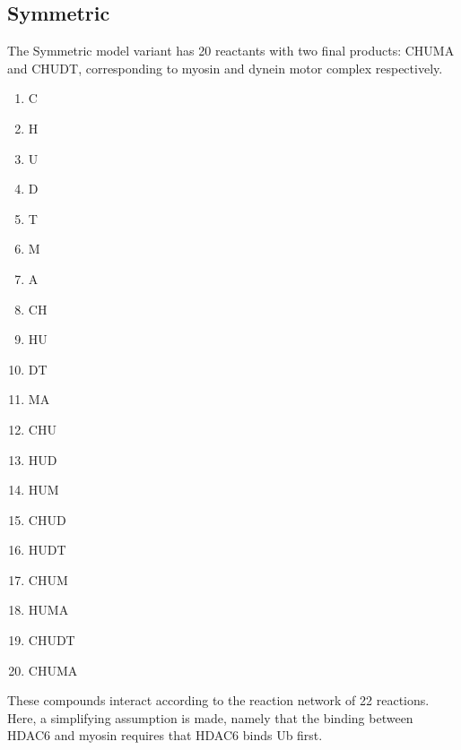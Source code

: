 \subsection{Symmetric}

The Symmetric model variant has 20 reactants with two final products: CHUMA and CHUDT, corresponding to myosin and dynein motor complex respectively.

\begin{multicols}{4}
\begin{enumerate}

\item C     %
\item H                    %
\item U                      %
\item D                     %
\item T         %
\item M                %
\item A              %

\item CH               %
\item HU             %
\item DT    %
\item MA  %

\item CHU                  %
\item HUD                  %
\item HUM              %

\item CHUD         %
\item HUDT     %
\item CHUM          %
\item HUMA   %

\item CHUDT    %
\item CHUMA %

\end{enumerate}
\end{multicols}

These compounds interact according to the reaction network of 22 reactions. Here, a simplifying assumption is made, namely that the binding between HDAC6 and myosin requires that HDAC6 binds Ub first.

